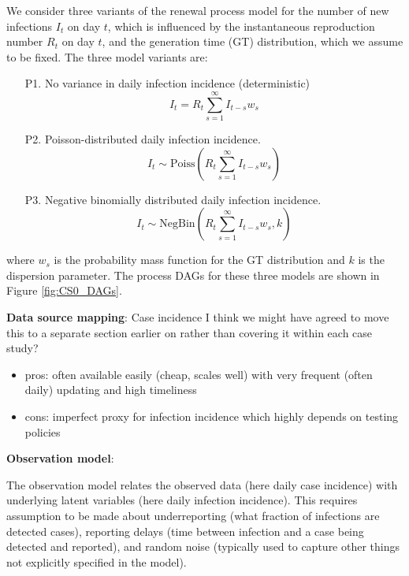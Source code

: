 \documentclass{article}
\begin{document}
We consider three variants of the renewal process model for the number of new infections $I_t$ on day $t$, which is influenced by the instantaneous reproduction number $R_t$ on day $t$, and the generation time (GT) distribution, which we assume to be fixed. The three model variants are:
\begin{itemize}
    \item[P1.] No variance in daily infection incidence (deterministic)
    \begin{equation}
        I_t = R_t \sum_{s=1}^\infty I_{t-s}w_s 
    \end{equation}
    \item[P2.] Poisson-distributed daily infection incidence.
        \begin{equation}
        I_t \sim \mathrm{Poiss}\left( R_t \sum_{s=1}^\infty I_{t-s}w_s  \right)
    \end{equation}
    \item[P3.] Negative binomially distributed daily infection incidence. 
            \begin{equation}
        I_t \sim \mathrm{NegBin}\left( R_t \sum_{s=1}^\infty I_{t-s}w_s, k  \right)
    \end{equation}
\end{itemize}
where $w_s$ is the probability mass function for the GT distribution and $k$ is the dispersion parameter. 
The process DAGs for these three models are shown in Figure \ref{fig:CS0_DAGs}.

 
\textbf{Data source mapping}: Case incidence {\color{red} I think we might have agreed to move this to a separate section earlier on rather than covering it within each case study?}
\begin{itemize}
    \item pros: often available easily (cheap, scales well) with very frequent (often daily) updating and high timeliness
    \item cons: imperfect proxy for infection incidence which highly depends on testing policies
\end{itemize}

\textbf{Observation model}:

The observation model relates the observed data (here daily case incidence) with underlying latent variables (here daily infection incidence). 
This requires assumption to be made about underreporting (what fraction of infections are detected cases), reporting delays (time between infection and a case being detected and reported), and random noise (typically used to capture other things not explicitly specified in the model).
\end{document}
